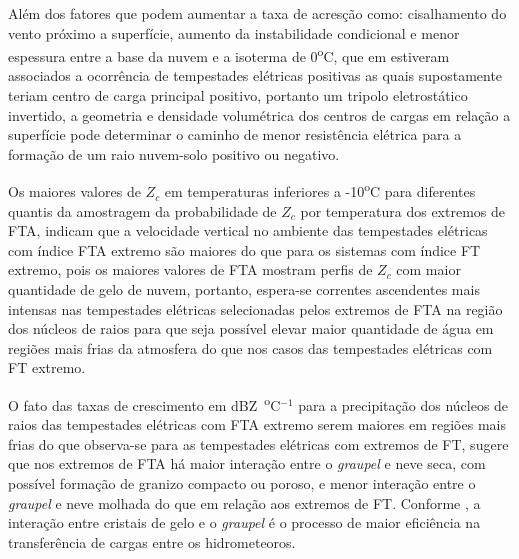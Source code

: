 
Além  dos fatores que podem aumentar a taxa de acresção como: cisalhamento do vento próximo a superfície, aumento da instabilidade condicional e menor espessura entre a base da nuvem e a isoterma de 0\textsuperscript{o}C, que em  estiveram associados a ocorrência de tempestades elétricas positivas as quais supostamente teriam centro de carga principal positivo, portanto um tripolo eletrostático invertido, a geometria e densidade volumétrica dos centros de cargas em relação a superfície pode determinar o caminho de menor resistência elétrica para a formação de um raio nuvem-solo positivo ou negativo.

Os maiores valores de $Z_c$ em temperaturas inferiores a -10\textsuperscript{o}C para diferentes quantis da amostragem da probabilidade de $Z_c$ por temperatura dos extremos de FTA, indicam que a velocidade vertical no ambiente das tempestades elétricas com índice FTA extremo são maiores do que para os sistemas com índice FT extremo, pois os maiores valores de FTA mostram perfis de $Z_c$ com maior quantidade de gelo de nuvem, portanto, espera-se correntes ascendentes mais intensas nas tempestades elétricas selecionadas pelos extremos de FTA na região dos núcleos de raios para que seja possível elevar maior quantidade de água em regiões mais frias da atmosfera do que nos casos das tempestades elétricas com FT extremo. 

O fato das taxas de crescimento em dBZ~\textsuperscript{o}C$^{-1}$ para a precipitação dos núcleos de raios das tempestades elétricas com FTA extremo serem maiores  em regiões mais frias do que observa-se para as tempestades elétricas com extremos de FT, sugere que nos extremos de FTA há maior interação entre o \textit{graupel} e neve seca, com possível formação de granizo compacto ou poroso, e menor interação entre o \textit{graupel} e neve molhada do que em relação aos extremos de FT. Conforme \cite{Takahashi1978}, a interação entre cristais de gelo e o \textit{graupel} é o processo de maior eficiência na transferência de cargas entre os hidrometeoros. 

